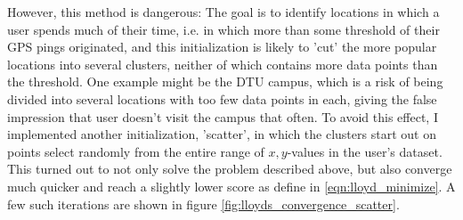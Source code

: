 However, this method is dangerous: The goal is to identify locations in which a user spends much of their time, i.e. in which more than some threshold of their GPS pings originated, and this initialization is likely to 'cut' the more popular locations into several clusters, neither of which contains more data points than the threshold. One example might be the DTU campus, which is a risk of being divided into several locations with too few data points in each, giving the false impression that user doesn't visit the campus that often. To avoid this effect, I implemented another initialization, 'scatter', in which the clusters start out on points select randomly from the entire range of $x,y$-values in the user's dataset. This turned out to not only solve the problem described above, but also converge much quicker and reach a slightly lower score as define in \eqref{eqn:lloyd_minimize}. A few such iterations are shown in figure \ref{fig:lloyds_convergence_scatter}.
